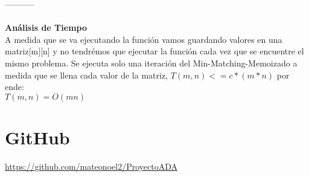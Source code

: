 \documentclass{article}
\begin{document}
-----------\\\\
\textbf{Análisis de Tiempo}\\
A medida que se va ejecutando la función vamos guardando valores en una matriz[m][n] y no tendrémos que ejecutar la función cada vez que se encuentre el mismo problema. Se ejecuta solo una iteración del Min-Matching-Memoizado a medida que se llena cada valor de la matriz, 
$T(m,n) <= c*(m*n)$ por ende:\\

$T(m,n) = O(mn)$

\section{GitHub}
\href{https://github.com/mateonoel2/ProyectoADA}{https://github.com/mateonoel2/ProyectoADA}
\end{document}
